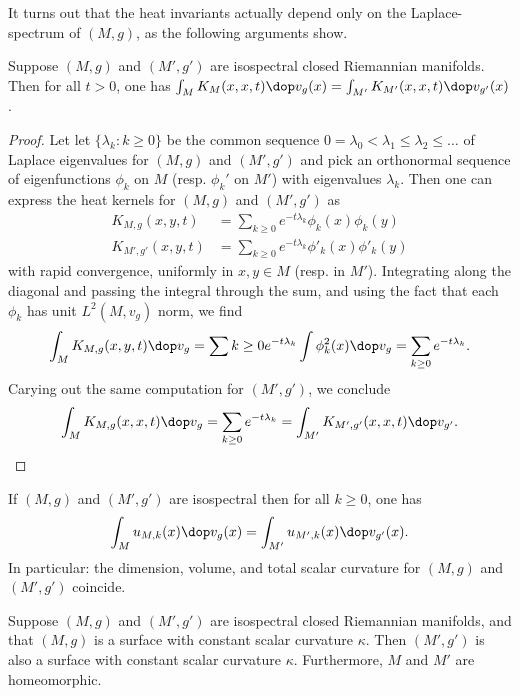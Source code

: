 It turns out that the heat invariants actually depend only on the Laplace-spectrum of $(M,g)$, as the following arguments show.
\begin{proposition}
  Suppose $(M,g)$ and $(M',g')$ are isospectral closed Riemannian manifolds.  Then for all $t>0$, one has $\int_M K_M(x,x,t) \dop v_g(x) = \int_{M'} K_{M'}(x,x,t)\dop v_{g'}(x)$.
\end{proposition}
\begin{proof}
  Let let $\{\lambda_k : k\geq 0\}$ be the common sequence $0 = \lambda_0 < \lambda_1 \leq \lambda_2 \leq \dots $ of Laplace eigenvalues for $(M,g)$ and $(M',g')$ and pick an orthonormal sequence of eigenfunctions $\phi_k$ on $M$ (resp. $\phi_k'$ on $M'$) with eigenvalues $\lambda_k$. Then one can express the heat kernels for $(M,g)$ and $(M',g')$ as
  \begin{align}
    K_{M,g}(x,y,t)   & = \sum_{k\geq 0}e^{-t \lambda_k}\phi_k(x) \phi_k(y)   \\
    K_{M',g'}(x,y,t) & = \sum_{k\geq 0}e^{-t \lambda_k}\phi'_k(x) \phi'_k(y)
  \end{align}
  with rapid convergence, uniformly in $x,y \in M$ (resp. in $M'$). Integrating along the diagonal and passing the integral through the sum, and using the fact that each $\phi_k$ has unit $L^2(M,v_g)$ norm,  we find
  \begin{align}
    \int_M K_{M,g}(x,y,t) \dop v_g  = \sum{k\geq 0}e^{-t \lambda_k} \int \phi_k^2(x)\dop v_g = \sum_{k\geq 0}e^{-t \lambda_k}.
  \end{align}
  Carying out the same computation for $(M',g')$, we conclude
  \begin{align}
    \int_M K_{M,g} (x,x,t) \dop v_g = \sum_{k\geq 0}e^{-t \lambda_k} = \int_{M'} K_{M',g'} (x,x,t) \dop v_{g'}.
  \end{align}
\end{proof}
\begin{corollary}\label{cor:dimVolTotScal}
  If $(M,g)$ and $(M',g')$ are isospectral then for all $k\geq 0$, one has
  \begin{align}
    \int_M u_{M,k}(x) \dop v_g(x)  = \int_{M'} u_{M',k}(x) \dop v_{g'}(x).
  \end{align}
  In particular: the dimension, volume, and total scalar curvature for $(M,g)$ and $(M',g')$ coincide.
\end{corollary}
\begin{proposition}\label{prop:curvatureTwoManifolds}
  Suppose  $(M,g)$ and $(M',g')$ are isospectral closed Riemannian manifolds, and that $(M,g)$ is a surface with constant scalar curvature $\kappa$. Then $(M',g')$ is also a surface with constant scalar curvature $\kappa$. Furthermore, $M$ and $M'$ are homeomorphic.
\end{proposition}
